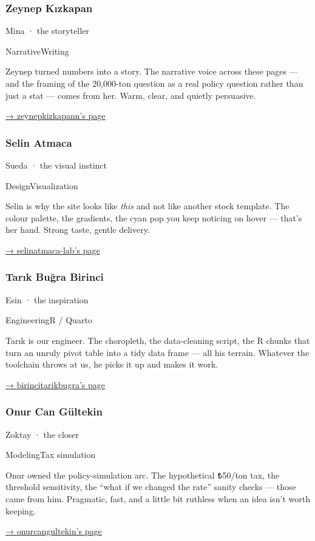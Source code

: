 \documentclass[
]{article}
\begin{document}
\subsubsection{Zeynep Kızkapan}\label{zeynep-kux131zkapan}

{Mina · the storyteller}

{NarrativeWriting}

Zeynep turned numbers into a story. The narrative voice across these
pages --- and the framing of the 20,000-ton question as a real policy
question rather than just a stat --- comes from her. Warm, clear, and
quietly persuasive.

\href{https://emu-hacettepe-analytics.github.io/emu430-spring2026-zeynepkizkapann/}{→
zeynepkizkapann's page}

\subsubsection{Selin Atmaca}\label{selin-atmaca}

{Sueda · the visual instinct}

{DesignVisualization}

Selin is why the site looks like \emph{this} and not like another stock
template. The colour palette, the gradients, the cyan pop you keep
noticing on hover --- that's her hand. Strong taste, gentle delivery.

\href{https://emu-hacettepe-analytics.github.io/emu430-spring2026-selinatmaca-lab/}{→
selinatmaca-lab's page}

\subsubsection{Tarık Buğra Birinci}\label{tarux131k-buux11fra-birinci}

{Esin · the inspiration}

{EngineeringR / Quarto}

Tarık is our engineer. The choropleth, the data-cleaning script, the R
chunks that turn an unruly pivot table into a tidy data frame --- all
his terrain. Whatever the toolchain throws at us, he picks it up and
makes it work.

\href{https://emu-hacettepe-analytics.github.io/emu430-spring2026-birincitarikbugra/}{→
birincitarikbugra's page}

\subsubsection{Onur Can Gültekin}\label{onur-can-guxfcltekin}

{Zoktay · the closer}

{ModelingTax simulation}

Onur owned the policy-simulation arc. The hypothetical ₺50/ton tax, the
threshold sensitivity, the ``what if we changed the rate'' sanity checks
--- those came from him. Pragmatic, fast, and a little bit ruthless when
an idea isn't worth keeping.

\href{https://emu-hacettepe-analytics.github.io/emu430-spring2026-onurcangultekin/}{→
onurcangultekin's page}
\end{document}
